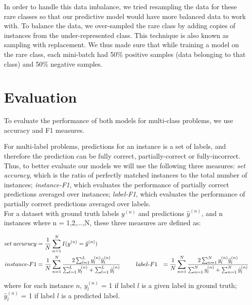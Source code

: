 In order to handle this data imbalance, we tried resampling the data for these rare classes so that our predictive model would have more balanced data to work with. To balance the data, we over-sampled the rare class by adding copies of instances from the under-represented class. This technique is also known as sampling with replacement. We thus made sure that while training a model on the rare class, each mini-batch had 50\% positive samples (data belonging to that class) and 50\% negative samples.

\section{Evaluation}

To evaluate the performance of both models for multi-class problems, we use accuracy and F1 measures.

For multi-label problems, predictions for an instance is a set of labels, and therefore the prediction can be fully correct, partially-correct or fully-incorrect. Thus, to better evaluate our models we will use the following three measures: \textit{set accuracy}, which is the ratio of perfectly matched instances to the total number of instances; \textit{instance-F1}, which evaluates the performance of partially correct predictions averaged over instances; \textit{label-F1}, which evaluates the performance of partially correct predictions averaged over labels.\\

For a dataset with ground truth labels $y^{(n)}$ and predictions $\hat{y}^{(n)}$, and n instances where n = 1,2,...,N, these three measures are defined as:

\begin{alignat}{2}
\label{eq:eval}
set\; accuracy & = \frac{1}{N} \sum_{n=1}^{N} {I(y^{(n)} = \hat{y}^{(n)})}\\
instance \mbox{-} F1 & = \frac{1}{N} \sum_{n=1}^{N} \frac{2\sum_{l=1}^{L} {y^{(n)}_{l} \hat{y}^{(n)}_{l}}}{\sum_{l=1}^{L} {y^{(n)}_{l}} + \sum_{l=1}^{L} {\hat{y}^{(n)}_{l}}}
\hspace{6ex}
label \mbox{-} F1 & = \frac{1}{N} \sum_{n=1}^{N} \frac{2\sum_{n=1}^{N} {y^{(n)}_{l} \hat{y}^{(n)}_{l}}}{\sum_{n=1}^{N} {y^{(n)}_{l}} + \sum_{n=1}^{N} {\hat{y}^{(n)}_{l}}}
\end{alignat}

\noindent where for each instance $n$, $y^{(n)}_{l}$ = 1 if label $l$ is a given label in ground truth; \\
$\hat{y}^{(n)}_{l}$ = 1 if label $l$ is a predicted label.

